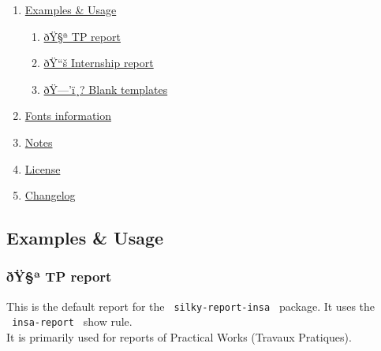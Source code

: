 \begin{enumerate}
\tightlist
\item
  \href{https://github.com/typst/packages/raw/main/packages/preview/silky-report-insa/0.4.0/\#examples}{Examples
  \& Usage}

  \begin{enumerate}
  \tightlist
  \item
    \href{https://github.com/typst/packages/raw/main/packages/preview/silky-report-insa/0.4.0/\#\%F0\%9F\%A7\%AA-tp-report}{ðŸ§ª
    TP report}
  \item
    \href{https://github.com/typst/packages/raw/main/packages/preview/silky-report-insa/0.4.0/\#\%F0\%9F\%93\%9A-internship-report}{ðŸ``š
    Internship report}
  \item
    \href{https://github.com/typst/packages/raw/main/packages/preview/silky-report-insa/0.4.0/\#\%F0\%9F\%97\%92\%EF\%B8\%8F-blank-templates}{ðŸ---'ï¸?
    Blank templates}
  \end{enumerate}
\item
  \href{https://github.com/typst/packages/raw/main/packages/preview/silky-report-insa/0.4.0/\#fonts}{Fonts
  information}
\item
  \href{https://github.com/typst/packages/raw/main/packages/preview/silky-report-insa/0.4.0/\#notes}{Notes}
\item
  \href{https://github.com/typst/packages/raw/main/packages/preview/silky-report-insa/0.4.0/\#license}{License}
\item
  \href{https://github.com/typst/packages/raw/main/packages/preview/silky-report-insa/0.4.0/\#changelog}{Changelog}
\end{enumerate}

\subsection{Examples \& Usage}\label{examples-usage}

\subsubsection{ðŸ§ª TP report}\label{uxf0uxffuxaa-tp-report}


This is the default report for the \texttt{\ silky-report-insa\ }
package. It uses the \texttt{\ insa-report\ } show rule.\\
It is primarily used for reports of Practical Works (Travaux Pratiques).

